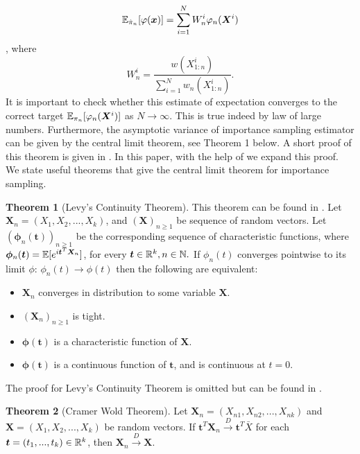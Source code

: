 \documentclass[10pt]{article}
\theoremstyle{definition}
\newtheorem{theorem}{Theorem}
\numberwithin{equation}{section}
\begin{document}
\begin{equation}
\mathbb{E}_{\hat{\pi}_n}[\varphi(\bm{x})] = \sum_{i=1}^{N} W_n^i \varphi_n(\bm{X}^i)
\end{equation}, where
\begin{equation}\label{eq:weights}
 W_n^i = \dfrac{w(X^i_{1:n})}{\sum_{i=1}^{N} w_n(X^i_{1:n})}.
\end{equation} It is important to check whether this estimate of expectation converges to the correct target $\mathbb{E}_{\pi_n}[\varphi_n(\bm{X}^i)]$ as $N \rightarrow \infty$. This is true indeed by law of large numbers. Furthermore, the asymptotic variance of importance sampling estimator can be given by the central limit theorem, see Theorem 1 below. A short proof of this theorem is given in \cite{geweke1989}. In this paper, with the help of \cite{impweb} we expand this proof. We state useful theorems that give the central limit theorem for importance sampling.
\begin{theorem}[Levy's Continuity Theorem] \label{levy}
	This theorem can be found in \cite{fristedt1996}. Let $\bm{X}_n = (X_{1}, X_{2}, ..., X_{k})$, and $(\bm{X})_{n \geq 1}$ be sequence of random vectors. Let $(\bm{\phi}_n(\bm{t}))_{n \geq 1}$ be the corresponding sequence of characteristic functions, where $\bm{\phi}_n(\bm{t}) = \mathbb{E}[e^{i\bm{t}^T\bm{X}_n}]$, for every $ \bm{t} \in \mathbb{R}^k, n \in \mathbb{N}.$ If $\phi_n(t)$ converges pointwise to its limit $\phi$: $\phi_n(t) \to \phi(t)$ then the following are equivalent:
	\begin{itemize}
		\item $\bm{X}_n$ converges in distribution to some variable $\bm{X}.$
		\item $(\bm{X}_n)_{n \geq 1}$ is tight.
		\item $\bm{\phi}(\bm{t})$ is a characteristic function of $\bm{X}$.
		\item $\bm{\phi}(\bm{t})$ is a continuous function of $\bm{t}$, and is continuous at $t=0$.
	\end{itemize}
\end{theorem} 
The proof for Levy's Continuity Theorem is omitted but can be found in \cite{fristedt1996}.

\begin{theorem}[Cramer Wold Theorem]
Let $\bm{X}_n = (X_{n1}, X_{n2}, ..., X_{nk})$ and $\bm{X} = (X_1, X_2, ..., X_k)$ be random vectors. If $\bm{t}^T \bm{X}_n \overset{D}{\to} \bm{t}^T \bar{X}$ for each $\bm{t} = (t_1, ..., t_k) \in \mathbb{R}^k$, then $\bm{X}_n \overset{D}{\to} \bm{X}$.
\end{theorem}
\end{document}

